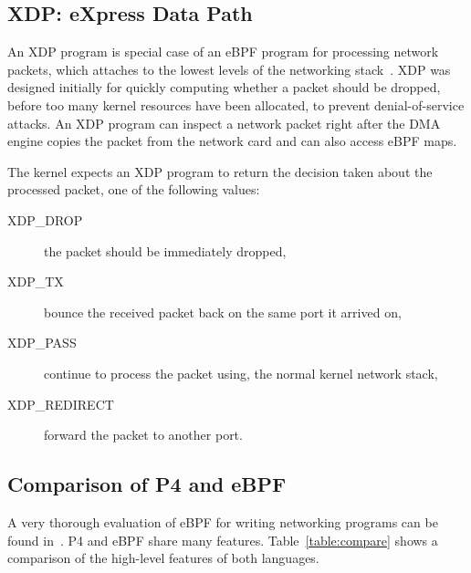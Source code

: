 \subsection{XDP: eXpress Data Path}\label{sec:xdp-background}

An XDP program is special case of an eBPF program for processing
network packets, which attaches to the lowest levels of the networking
stack~\cite{xdpconext18}.  XDP was designed initially for quickly computing whether a
packet should be dropped, before too many kernel resources have been
allocated, to prevent denial-of-service attacks.  An XDP program can
inspect a network packet right after the DMA engine copies the packet
from the network card and can also access eBPF maps.

The kernel expects an XDP program to return the decision taken about the 
processed packet, one of the
following values:

\begin{description}
\item[XDP\_DROP] the packet should be immediately dropped,
\item[XDP\_TX] bounce the received packet back on the same port it arrived on,
\item[XDP\_PASS] continue to process the packet using,
  the normal kernel network stack,
\item[XDP\_REDIRECT] forward the packet to another port.
\end{description}

\subsection{Comparison of P4 and eBPF}

A very thorough evaluation of eBPF for writing networking programs can
be found in~\cite{minao-hspr18}.  P4 and eBPF share many features.
Table~\ref{table:compare} shows a comparison of the high-level
features of both languages.

